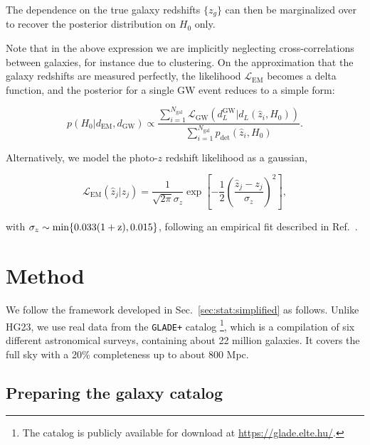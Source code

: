 \documentclass[%
preprint,
nofootinbib,
 amsmath,amssymb,
 aps,
]{revtex4-2}
\newcommand{\given}[2]{p( #1 | #2 )}
\newcommand{\pdet}[0]{p_{\text{det}}}
\begin{document}
The dependence on the true galaxy redshifts $\{z_g\}$ can then be marginalized over to recover the
posterior distribution on $H_0$ only.

Note that in the above expression we are implicitly neglecting cross-correlations between galaxies,
for instance due to clustering. On the approximation that the galaxy redshifts are measured
perfectly, the likelihood $\mathcal{L}_\text{EM}$ becomes a delta function, and the posterior for a
single GW event reduces to a simple form:

\begin{equation}
	\label{eq:stat:perfect-redshift-posterior}
	\given{H_0}{d_\text{EM}, d_\text{GW}} \propto
	\frac{\sum_{i=1}^{N_\text{gal}} \mathcal{L}_\text{GW}(d^\text{GW}_L | d_L(\hat{z}_i, H_0))}{\sum_{i=1}^{N_\text{gal}} \pdet(\hat{z}_i, H_0)}.
\end{equation}

Alternatively, we model the photo-$z$ redshift likelihood as a gaussian,

\begin{equation}
	\label{eq:stat:photo-z-likelihood}
	\mathcal{L}_\text{EM}(\hat{z}_j | z_j) = \frac{1}{\sqrt{2 \pi} \sigma_z} \exp{\left [-\frac{1}{2} \left (\frac{\hat{z}_j - z_j}{\sigma_z} \right )^2 \right ]},
\end{equation}

with $\sigma_z \sim \rm{min}\{0.033(1+z), 0.015\}$, following an empirical fit described in
Ref.~.

\section{Method}
\label{sec:method}

We follow the framework developed in Sec.~\ref{sec:stat:simplified} as follows. Unlike HG23, we use
real data from the \texttt{GLADE+} catalog \cite{D_lya_2018,D_lya_2022} \footnote{The catalog is
	publicly available for download at \url{https://glade.elte.hu/}.}, which is a compilation of six
different astronomical surveys, containing about 22 million galaxies. It covers the full sky with a
20\% completeness up to about 800 Mpc.

\subsection{Preparing the galaxy catalog}
\end{document}
